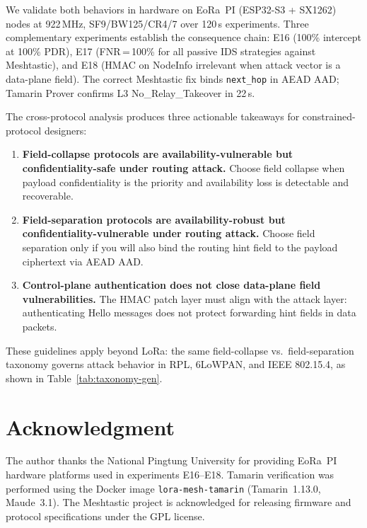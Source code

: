 \documentclass[journal]{IEEEtran}
\begin{document}
We validate both behaviors in hardware on EoRa~PI (ESP32-S3 + SX1262)
nodes at 922\,MHz, SF9/BW125/CR4/7 over 120\,s experiments. Three
complementary experiments establish the consequence chain: E16 (100\%
intercept at 100\% PDR), E17 (FNR\,=\,100\% for all passive IDS strategies
against Meshtastic), and E18 (HMAC on NodeInfo irrelevant when attack vector
is a data-plane field). The correct Meshtastic fix binds \texttt{next\_hop}
in AEAD AAD; Tamarin Prover confirms L3 No\_Relay\_Takeover in 22\,s.

The cross-protocol analysis produces three actionable takeaways for
constrained-protocol designers:

\begin{enumerate}
  \item \textbf{Field-collapse protocols are availability-vulnerable but
    confidentiality-safe under routing attack.} Choose field collapse when
    payload confidentiality is the priority and availability loss is
    detectable and recoverable.

  \item \textbf{Field-separation protocols are availability-robust but
    confidentiality-vulnerable under routing attack.} Choose field separation
    only if you will also bind the routing hint field to the payload
    ciphertext via AEAD AAD.

  \item \textbf{Control-plane authentication does not close data-plane
    field vulnerabilities.} The HMAC patch layer must align with the attack
    layer: authenticating Hello messages does not protect forwarding hint
    fields in data packets.
\end{enumerate}

These guidelines apply beyond LoRa: the same field-collapse vs.\
field-separation taxonomy governs attack behavior in RPL, 6LoWPAN, and
IEEE 802.15.4, as shown in Table~\ref{tab:taxonomy-gen}.

\section*{Acknowledgment}

The author thanks the National Pingtung University for providing EoRa~PI
hardware platforms used in experiments E16--E18. Tamarin verification was
performed using the Docker image \texttt{lora-mesh-tamarin} (Tamarin~1.13.0,
Maude~3.1). The Meshtastic project is acknowledged for releasing firmware
and protocol specifications under the GPL license.



\end{document}
